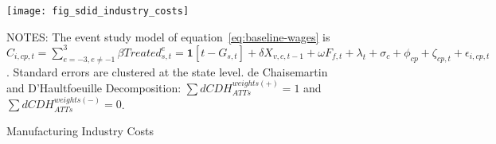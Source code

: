 \begin{figure}[H]
    \centering
    \texttt{[image: fig\_sdid\_industry\_costs]}
    \caption{Manufacturing Industry Costs}
    \label{fig:baseline-manufacturing-industry-costs}
    \begin{minipage}{\columnwidth}
        \vspace{0.05in}
        \tiny NOTES: The event study model of equation~\ref{eq:baseline-wages} is $C_{i,cp,t} = \sum_{{e = -3},{e \neq -1}}^{3} \beta Treated_{s,t}^e = \textbf{1}[t - G_{s,t}] + \delta X_{v,c,t-1} + \omega F_{f,t} + \lambda_{t} + \sigma_{c} + \phi_{cp} + \zeta_{cp,t} + \epsilon_{i,cp,t}$. Standard errors are clustered at the state level. de Chaisemartin and D'Haultfoeuille Decomposition: $\sum dCDH_{ATTs}^{weights(+)} = 1$ and $\sum dCDH_{ATTs}^{weights(-)} = 0$.
    \end{minipage}
\end{figure}
